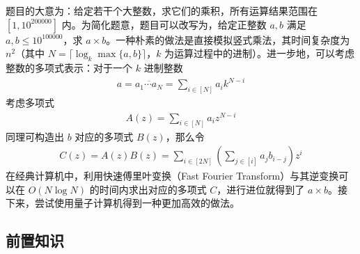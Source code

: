 \documentclass[a4paper,11pt,onecolumn,twoside]{article}
\begin{document}
题目的大意为：给定若干个大整数，求它们的乘积，所有运算结果范围在 $[1,10^{200000}]$ 内。为简化题意，题目可以改写为，给定正整数 $a,b$ 满足 $a,b\le 10^{100000}$，求 $a\times b$。一种朴素的做法是直接模拟竖式乘法，其时间复杂度为 $n^2$（其中 $N=\lceil\log_k\max\{a,b\}\rceil$，$k$ 为运算过程中的进制）。进一步地，可以考虑整数的多项式表示：对于一个 $k$ 进制整数 \begin{align}
    a=\overline{a_1\cdots a_N}=\sum_{i\in[N]}a_i k^{N-i}
\end{align}
考虑多项式 \begin{align}
    A(z)=\sum_{i\in[N]}a_i z^{N-i}
\end{align}
同理可构造出 $b$ 对应的多项式 $B(z)$，那么令 \begin{align}
    C(z)=A(z)B(z)=\sum_{i\in[2N]}\left(\sum_{j\in[i]}a_jb_{i-j}\right)z^i
\end{align}
在经典计算机中，利用快速傅里叶变换（Fast Fourier Transform）与其逆变换可以在 $O(N\log N)$ 的时间内求出对应的多项式 $C$\cite{cooley1965algorithm}，进行进位就得到了 $a\times b$。接下来，尝试使用量子计算机得到一种更加高效的做法。

\subsection{前置知识}
\end{document}
